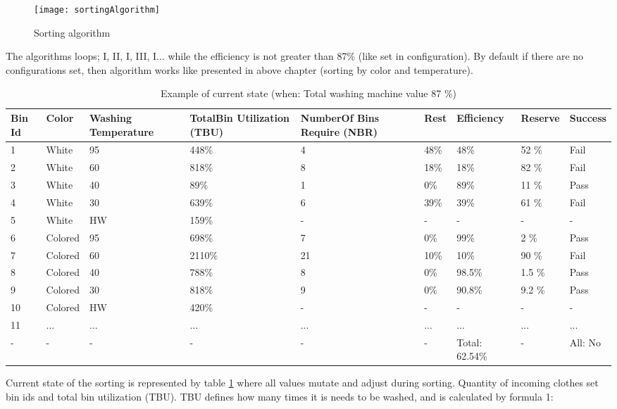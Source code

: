 \begin{figure}[h]
	\centering
		\texttt{[image: sortingAlgorithm]}
	\caption{Sorting algorithm}
	\label{fig:sortingAlgorithm}
\end{figure}

The algorithms loops;  I, II, I, III, I... while the efficiency is not greater than 87\% (like set in configuration). By default if there are no configurations set, then algorithm works like presented in above chapter (sorting by color and temperature).

\begin{table}[h]
	
    \begin{tabular}{ | p{0.4cm} | p{1cm} | p{2cm} | p{1.7cm} |p{2cm} |p{1cm} |p{1.3cm} |p{1.2cm} |p{1.3cm} |}
    \hline
	Bin Id & Color & Washing Temperature & TotalBin Utilization (TBU) & NumberOf Bins Require (NBR) & Rest & Efficiency & Reserve & Success\\ \hline
	1 & White & 95 & 448\% & 4 & 48\% & 48\% & 52 \% & Fail \\ \hline
	2 & White & 60 & 818\% & 8 & 18\% & 18\% & 82 \% & Fail \\ \hline
	3 & White & 40 & 89\% & 1 & 0\% & 89\% & 11 \% & Pass \\ \hline
	4 & White & 30 & 639\% & 6 & 39\% & 39\% & 61 \% & Fail \\ \hline
	5 & White & HW & 159\% & - & - & - & - & - \\ \hline
	6 & Colored & 95 & 698\% & 7 & 0\% & 99\% & 2 \% & Pass \\ \hline
	7 & Colored & 60 & 2110\% & 21 & 10\% & 10\% & 90 \% & Fail \\ \hline
	8 & Colored & 40 & 788\% & 8 & 0\% & 98.5\% & 1.5 \% & Pass \\ \hline
	9 & Colored & 30 & 818\% & 9 & 0\% & 90.8\% & 9.2 \% & Pass \\ \hline
	10 & Colored & HW & 420\% & - & - & - & - & - \\ \hline
	11 & ... & ... & ... & ... & ... & ... & ... & ... \\ \hline
	- & - & - & - & - & - & Total: 62.54\% & - & All: No \\ \hline
    \end{tabular}
	\caption{Example of current state (when: Total washing machine value 87 \%)}
	\label{tab:currentState}
\end{table}

\newpage

Current state of the sorting is represented by table \ref{tab:currentState} where all values mutate and adjust during sorting. Quantity of incoming clothes set bin ids and total bin utilization (TBU). TBU defines how many times it is needs to be washed, and is calculated by formula 1:

